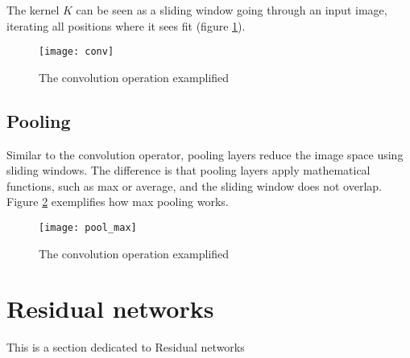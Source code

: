 The kernel $K$ can be seen as a sliding window going through an input image, iterating all positions where it sees fit (figure \ref{fig:conv}).

\begin{figure}[b!]
\centering
\texttt{[image: conv]}
\caption{The convolution operation examplified}
\label{fig:conv}
\end{figure}


\subsection{Pooling}
\label{subsec:obj_cnn_pooling}

Similar to the convolution operator, pooling layers reduce the image space using sliding windows. The difference is that pooling layers apply mathematical functions, such as max or average, and the sliding window does not overlap. Figure \ref{fig:pool_max} exemplifies how max pooling works.

\begin{figure}[b!]
\centering
\texttt{[image: pool\_max]}
\caption{The convolution operation examplified}
\label{fig:pool_max}
\end{figure}

\section{Residual networks}
\label{sec:obj_resnet}

This is a section dedicated to Residual networks \cite{resnet}